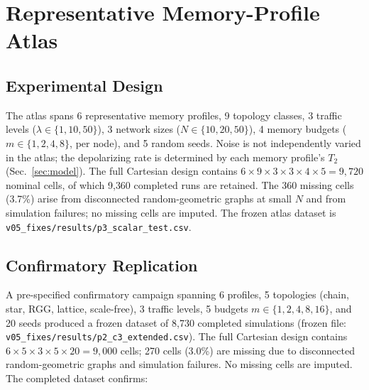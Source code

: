\documentclass[quantumrep,article,submit,moreauthors]{Definitions/mdpi}
\begin{document}
\section{Representative Memory-Profile Atlas}

\subsection{Experimental Design}

The atlas spans 6 representative memory profiles, 9 topology classes, 3 traffic levels ($\lambda \in \{1, 10, 50\}$), 3 network sizes ($N \in \{10, 20, 50\}$), 4 memory budgets ($m \in \{1, 2, 4, 8\}$, per node), and 5 random seeds. Noise is not independently varied in the atlas; the depolarizing rate is determined by each memory profile's $T_2$ (Sec.~\ref{sec:model}). The full Cartesian design contains $6 \times 9 \times 3 \times 3 \times 4 \times 5 = 9{,}720$ nominal cells, of which 9{,}360 completed runs are retained. The 360 missing cells (3.7\%) arise from disconnected random-geometric graphs at small $N$ and from simulation failures; no missing cells are imputed. The frozen atlas dataset is \texttt{v05\_fixes/results/p3\_scalar\_test.csv}.

\subsection{Confirmatory Replication}

{\sloppy
A pre-specified confirmatory campaign spanning 6 profiles, 5 topologies (chain, star, RGG, lattice, scale-free), 3 traffic levels, 5 budgets $m \in \{1,2,4,8,16\}$, and 20 seeds produced a frozen dataset of 8{,}730 completed simulations (frozen file: \allowbreak\texttt{v05\_fixes/results/p2\_c3\_extended.csv}). The full Cartesian design contains $6 \times 5 \times 3 \times 5 \times 20 = 9{,}000$ cells; 270 cells (3.0\%) are missing due to disconnected random-geometric graphs and simulation failures. No missing cells are imputed. The completed dataset confirms:
}
\end{document}
